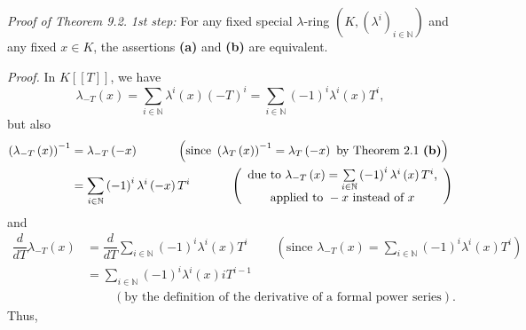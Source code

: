 \documentclass[numbers=enddot,12pt,final,onecolumn,notitlepage]{scrartcl}%
\begin{document}
\textit{Proof of Theorem 9.2.} \textit{1st step:} For any fixed special
$\lambda$-ring $\left(  K,\left(  \lambda^{i}\right)  _{i\in\mathbb{N}%
}\right)  $ and any fixed $x\in K$, the assertions \textbf{(a)} and
\textbf{(b)} are equivalent.

\textit{Proof.} In $K\left[  \left[  T\right]  \right]  $, we have%
\[
\lambda_{-T}\left(  x\right)  =\sum_{i\in\mathbb{N}}\lambda^{i}\left(
x\right)  \left(  -T\right)  ^{i}=\sum_{i\in\mathbb{N}}\left(  -1\right)
^{i}\lambda^{i}\left(  x\right)  T^{i},
\]
but also%
\begin{align*}
\left(  \lambda_{-T}\left(  x\right)  \right)  ^{-1}  &  =\lambda_{-T}\left(
-x\right)  \ \ \ \ \ \ \ \ \ \ \left(  \text{since }\left(  \lambda_{T}\left(
x\right)  \right)  ^{-1}=\lambda_{T}\left(  -x\right)  \text{ by Theorem 2.1
\textbf{(b)}}\right) \\
&  =\sum_{i\in\mathbb{N}}\left(  -1\right)  ^{i}\lambda^{i}\left(  -x\right)
T^{i}\ \ \ \ \ \ \ \ \ \ \left(
\begin{array}
[c]{c}%
\text{due to }\lambda_{-T}\left(  x\right)  =\sum\limits_{i\in\mathbb{N}%
}\left(  -1\right)  ^{i}\lambda^{i}\left(  x\right)  T^{i}\text{,}\\
\text{applied to }-x\text{ instead of }x
\end{array}
\right)
\end{align*}
and%
\begin{align*}
\dfrac{d}{dT}\lambda_{-T}\left(  x\right)   &  =\dfrac{d}{dT}\sum
_{i\in\mathbb{N}}\left(  -1\right)  ^{i}\lambda^{i}\left(  x\right)
T^{i}\ \ \ \ \ \ \ \ \ \ \left(  \text{since }\lambda_{-T}\left(  x\right)
=\sum_{i\in\mathbb{N}}\left(  -1\right)  ^{i}\lambda^{i}\left(  x\right)
T^{i}\right) \\
&  =\sum_{i\in\mathbb{N}}\left(  -1\right)  ^{i}\lambda^{i}\left(  x\right)
iT^{i-1}\\
&  \ \ \ \ \ \ \ \ \ \ \left(  \text{by the definition of the derivative of a
formal power series}\right)  .
\end{align*}
Thus,%
\end{document}
